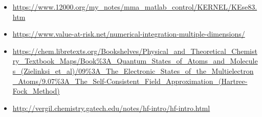 \documentclass[10pt, oneside, letterpaper]{article}
\begin{document}
\begin{itemize}
  \item \url{https://www.12000.org/my\_notes/mma\_matlab\_control/KERNEL/KEse83.htm} %
  \item \url{https://www.value-at-risk.net/numerical-integration-multiple-dimensions/} %
  \item \url{https://chem.libretexts.org/Bookshelves/Physical_and_Theoretical_Chemistry_Textbook_Maps/Book%3A_Quantum_States_of_Atoms_and_Molecules_(Zielinksi_et_al)/09%3A_The_Electronic_States_of_the_Multielectron_Atoms/9.07%3A_The_Self-Consistent_Field_Approximation_(Hartree-Fock_Method)} %
  \item \url{http://vergil.chemistry.gatech.edu/notes/hf-intro/hf-intro.html} %

\end{itemize}
\end{document}
